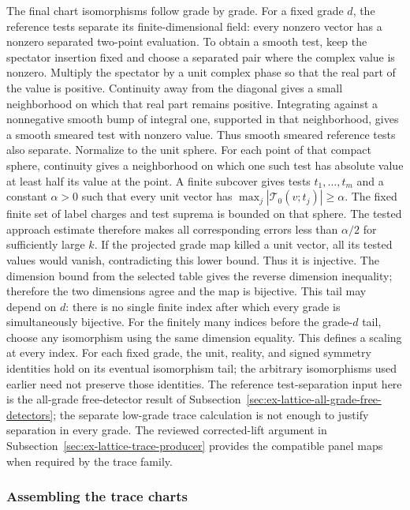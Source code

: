 The final chart isomorphisms follow grade by grade. For a fixed grade $d$,
the reference tests separate its finite-dimensional field: every nonzero
vector has a nonzero separated two-point evaluation. To obtain a smooth
test, keep the spectator insertion fixed and choose a separated pair where
the complex value is nonzero. Multiply the spectator by a unit complex
phase so that the real part of the value is positive. Continuity away from
the diagonal gives a small neighborhood on which that real part remains
positive. Integrating against a nonnegative smooth bump of integral one,
supported in that neighborhood, gives a smooth smeared test with nonzero
value. Thus smooth smeared reference tests also separate. Normalize to the
unit sphere. For
each point of that compact sphere, continuity gives a neighborhood on
which one such test has absolute value at least half its value at the
point. A finite subcover gives tests $t_1,\ldots,t_m$ and a constant
$\alpha>0$ such that every unit vector has
$\max_j|\mathcal T_0(v;t_j)|\geq\alpha$. The fixed finite set of
label charges and test suprema is bounded on that sphere. The tested
approach estimate therefore makes all corresponding errors less than
$\alpha/2$ for sufficiently large $k$. If the projected grade map killed a
unit vector, all its tested values would vanish, contradicting this lower
bound. Thus it is injective. The dimension bound from the selected table gives the reverse
dimension inequality; therefore the two dimensions agree and the map is
bijective. This tail may depend on $d$: there is no single finite index
after which every grade is simultaneously bijective. For the finitely many
indices before the grade-$d$ tail, choose any isomorphism using the same
dimension equality. This defines a scaling at every index. For each fixed
grade, the unit, reality, and signed symmetry identities hold on its
eventual isomorphism tail; the arbitrary isomorphisms used earlier need not
preserve those identities. The reference test-separation input here is the
all-grade free-detector result of
Subsection~\ref{sec:ex-lattice-all-grade-free-detectors}; the separate
low-grade trace calculation is not enough to justify separation in every
grade. The reviewed corrected-lift argument in
Subsection~\ref{sec:ex-lattice-trace-producer}
provides the compatible panel maps when required by the trace family.

\subsubsection{Assembling the trace charts}

